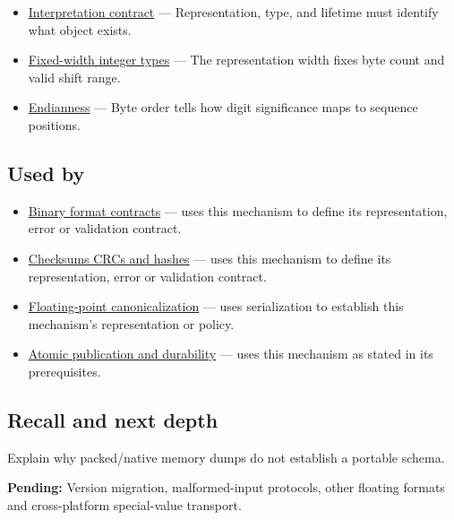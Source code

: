 \hypertarget{appendix-91d09ebed979-prerequisites}{}

\begin{itemize}
\tightlist
\item
  \hyperref[appendix-f414bd4ed05c]{Interpretation contract} --- Representation, type, and lifetime must identify what object exists.
\item
  \hyperref[appendix-cc04044b5782]{Fixed-width integer types} --- The representation width fixes byte count and valid shift range.
\item
  \hyperref[appendix-bc07c3d25b18]{Endianness} --- Byte order tells how digit significance maps to sequence positions.
\end{itemize}

\subsection{Used by}\label{appendix-91d09ebed979-used-by}

\hypertarget{appendix-91d09ebed979-used-by}{}

\begin{itemize}
\item
  \hyperref[appendix-590bbb2424c1]{Binary format contracts} --- uses this mechanism to define its representation, error or validation contract.
\item
  \hyperref[appendix-ed338677de0a]{Checksums CRCs and hashes} --- uses this mechanism to define its representation, error or validation contract.
\item
  \hyperref[appendix-e90053a4b201]{Floating-point canonicalization} --- uses serialization to establish this mechanism's representation or policy.
\item
  \hyperref[appendix-e89a8f290ef5]{Atomic publication and durability} --- uses this mechanism as stated in its prerequisites.
\end{itemize}

\subsection{Recall and next depth}\label{appendix-91d09ebed979-recall-and-next-depth}

\hypertarget{appendix-91d09ebed979-recall-and-next-depth}{}

Explain why packed/native memory dumps do not establish a portable schema.

\textbf{Pending:} Version migration, malformed-input protocols, other floating formats and cross-platform special-value transport.

